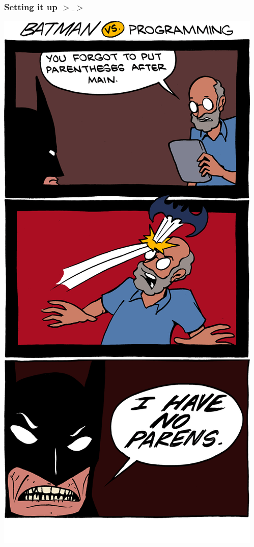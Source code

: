 \documentclass[%
        hyperref={%
                pdfauthor={Zakariyya Mughal},%
                pdfpagemode={None},pdfpagelayout={SinglePage}}%
        xcolor={x11names},%
]{beamer}
\begin{document}
\begin{frame}
\frametitle{Setting it up $>\_>$}
\begin{center}
\includegraphics[height=0.9\textheight]{gfx/smbc-batman.png}
\end{center}
\end{frame}
\end{document}
